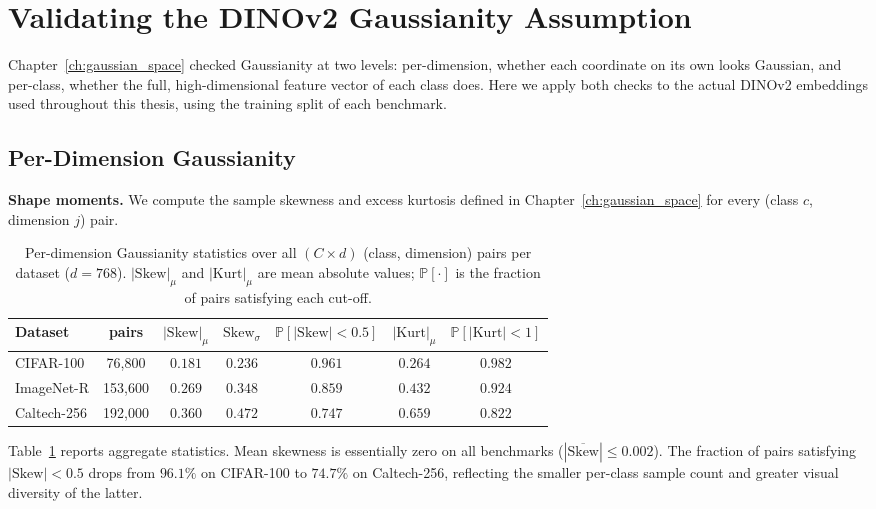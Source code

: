 \section{Validating the DINOv2 Gaussianity Assumption}
\label{sec:gaussianity_results}

Chapter~\ref{ch:gaussian_space} checked Gaussianity at two levels: per-dimension, whether each coordinate on its own looks Gaussian, and per-class, whether the full, high-dimensional feature vector of each class does. Here we apply both checks to the actual DINOv2 embeddings used throughout this thesis, using the training split of each benchmark.

\subsection{Per-Dimension Gaussianity}
\label{sec:uv_gaussianity}

\textbf{Shape moments.}
We compute the sample skewness and excess kurtosis defined in Chapter~\ref{ch:gaussian_space} for every (class $c$, dimension $j$) pair.

\begin{table}[htb]
    \centering
    \caption{Per-dimension Gaussianity statistics over all $(C \times d)$ (class, dimension) pairs per dataset ($d=768$). $|\!\mathrm{Skew}|_\mu$ and $|\!\mathrm{Kurt}|_\mu$ are mean absolute values; $\mathbb{P}[\cdot]$ is the fraction of pairs satisfying each cut-off.}
    \label{tab:gaussianity_stats}
    \small
    \setlength{\tabcolsep}{4pt}
    \begin{tabular}{lcc cc cc}
        \toprule
        \textbf{Dataset} & \textbf{pairs} & $|\!\mathrm{Skew}|_\mu$ & $\mathrm{Skew}_\sigma$ & $\mathbb{P}[|\mathrm{Skew}|{<}0.5]$ & $|\!\mathrm{Kurt}|_\mu$ & $\mathbb{P}[|\mathrm{Kurt}|{<}1]$ \\
        \midrule
        CIFAR-100   & 76,800  & $0.181$ & $0.236$ & $0.961$ & $0.264$ & $0.982$ \\
        ImageNet-R  & 153,600 & $0.269$ & $0.348$ & $0.859$ & $0.432$ & $0.924$ \\
        Caltech-256 & 192,000 & $0.360$ & $0.472$ & $0.747$ & $0.659$ & $0.822$ \\
        \bottomrule
    \end{tabular}
\end{table}

Table~\ref{tab:gaussianity_stats} reports aggregate statistics. Mean skewness is essentially zero on all benchmarks ($|\overline{\mathrm{Skew}}| \le 0.002$). The fraction of pairs satisfying $|\mathrm{Skew}|<0.5$ drops from $96.1\%$ on CIFAR-100 to $74.7\%$ on Caltech-256, reflecting the smaller per-class sample count and greater visual diversity of the latter.

